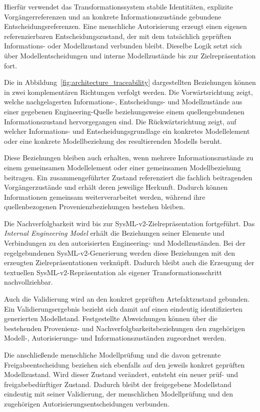 Hierfür verwendet das Transformationssystem stabile Identitäten, explizite
Vorgängerreferenzen und an konkrete Informationszustände gebundene
Entscheidungsreferenzen. Eine menschliche Autorisierung erzeugt einen eigenen
referenzierbaren Entscheidungszustand, der mit dem tatsächlich geprüften
Informations- oder Modellzustand verbunden bleibt. Dieselbe Logik setzt sich
über Modellentscheidungen und interne Modellzustände bis zur
Zielrepräsentation fort.

Die in Abbildung~\ref{fig:architecture_traceability} dargestellten
Beziehungen können in zwei komplementären Richtungen verfolgt werden. Die
Vorwärtsrichtung zeigt, welche nachgelagerten Informations-,
Entscheidungs- und Modellzustände aus einer gegebenen Engineering-Quelle
beziehungsweise einem quellengebundenen Informationszustand hervorgegangen
sind. Die Rückwärtsrichtung zeigt, auf welcher Informations- und
Entscheidungsgrundlage ein konkretes Modellelement oder eine konkrete
Modellbeziehung des resultierenden Modells beruht.

Diese Beziehungen bleiben auch erhalten, wenn mehrere Informationszustände
zu einem gemeinsamen Modellelement oder einer gemeinsamen Modellbeziehung
beitragen. Ein zusammengeführter Zustand referenziert die fachlich
beitragenden Vorgängerzustände und erhält deren jeweilige Herkunft. Dadurch
können Informationen gemeinsam weiterverarbeitet werden, während ihre
quellenbezogenen Provenienzbeziehungen bestehen bleiben.

Die Nachverfolgbarkeit wird bis zur SysML-v2-Zielrepräsentation fortgeführt.
Das \emph{Internal Engineering Model} erhält die Beziehungen seiner Elemente
und Verbindungen zu den autorisierten Engineering- und Modellzuständen. Bei
der regelgebundenen SysML-v2-Generierung werden diese Beziehungen mit den
erzeugten Zielrepräsentationen verknüpft. Dadurch bleibt auch die Erzeugung
der textuellen SysML-v2-Repräsentation als eigener Transformationsschritt
nachvollziehbar.

Auch die Validierung wird an den konkret geprüften Artefaktzustand gebunden.
Ein Validierungsergebnis bezieht sich damit auf einen eindeutig
identifizierten generierten Modellstand. Festgestellte Abweichungen können
über die bestehenden Provenienz- und Nachverfolgbarkeitsbeziehungen den
zugehörigen Modell-, Autorisierungs- und Informationszuständen zugeordnet
werden.

Die anschließende menschliche Modellprüfung und die davon getrennte
Freigabeentscheidung beziehen sich ebenfalls auf den jeweils konkret
geprüften Modellzustand. Wird dieser Zustand verändert, entsteht ein neuer
prüf- und freigabebedürftiger Zustand. Dadurch bleibt der freigegebene
Modellstand eindeutig mit seiner Validierung, der menschlichen Modellprüfung
und den zugehörigen Autorisierungsentscheidungen verbunden.

